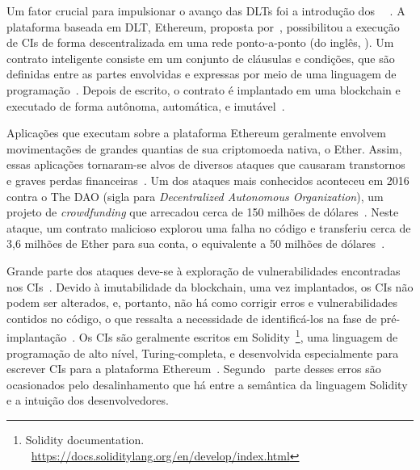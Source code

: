 Um fator crucial para impulsionar o avanço das DLTs foi a introdução dos ~~\cite{maesa2020blockchain3.0}. A plataforma baseada em DLT, Ethereum, proposta por~, possibilitou a execução de CIs de forma descentralizada em uma rede ponto-a-ponto (do inglês, ). Um contrato inteligente consiste em um conjunto de cláusulas e condições, que são definidas entre as partes envolvidas e expressas por meio de uma linguagem de programação~\cite{overview-smartcontracts2020zheng}. Depois de escrito, o contrato é implantado em uma blockchain e executado de forma autônoma, automática, e imutável~\cite{overview-smartcontracts2020zheng, kannengiesser2020trade-offs-acmcs}. 


Aplicações que executam sobre a plataforma Ethereum geralmente envolvem movimentações de grandes quantias de sua criptomoeda nativa, o Ether. Assim, essas aplicações tornaram-se alvos de diversos ataques que causaram transtornos e graves perdas financeiras~\cite{atzei2017survey-attacks-sok, chen2020survey-ethereum-acm}. Um dos ataques mais conhecidos aconteceu em 2016 contra o The DAO (sigla para \textit{Decentralized
Autonomous Organization}), um projeto de \textit{crowdfunding} que arrecadou cerca de 150 milhões de dólares~\cite{chen2020survey-ethereum-acm}. Neste ataque, um contrato malicioso explorou uma falha no código e transferiu cerca de 3,6 milhões de Ether para sua conta, o equivalente a 50 milhões de dólares~\cite{chen2020survey-ethereum-acm, siegel-dao-attack, atzei2017survey-attacks-sok}. 

Grande parte dos ataques deve-se à exploração de vulnerabilidades encontradas nos CIs~\cite{chen2020survey-ethereum-acm, atzei2017survey-attacks-sok, liu2019survey-ieeeaccess}. Devido à imutabilidade da blockchain, uma vez implantados, os CIs não podem ser alterados, e, portanto, não há como corrigir erros e vulnerabilidades contidos no código, o que ressalta a necessidade de identificá-los na fase de pré-implantação~\cite{vacca2020systematic, dika2018security}. Os CIs são geralmente escritos em Solidity~\footnote{Solidity documentation. ~\url{https://docs.soliditylang.org/en/develop/index.html}}, uma linguagem de programação de alto nível, Turing-completa, e desenvolvida especialmente para escrever CIs para a plataforma Ethereum~\cite{varela2021smart-languages-acmcs}.    Segundo~ parte desses erros são ocasionados pelo desalinhamento que há entre a semântica da linguagem Solidity e a intuição dos desenvolvedores. 

